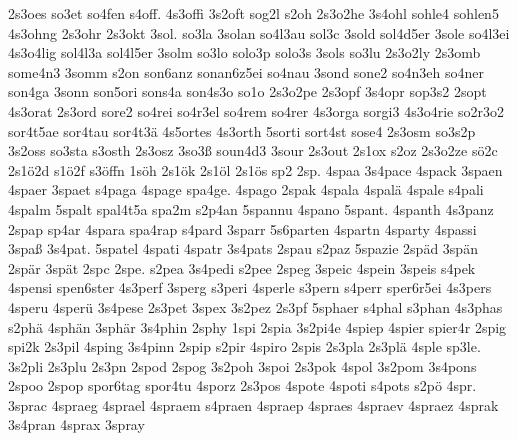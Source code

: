 {    2s3oes
    so3et
    so4fen
    s4off.
    4s3offi
    3s2oft
    sog2l
    s2oh
    2s3o2he
    3s4ohl
    sohle4
    sohlen5
    4s3ohng
    2s3ohr
    2s3okt
    3sol.
    so3la
    3solan
    so4l3au
    sol3c
    3sold
    sol4d5er
    3sole
    so4l3ei
    4s3o4lig
    sol4l3a
    sol4l5er
    3solm
    so3lo
    solo3p
    solo3s
    3sols
    so3lu
    2s3o2ly
    2s3omb
    some4n3
    3somm
    s2on
    son6anz
    sonan6z5ei
    so4nau
    3sond
    sone2
    so4n3eh
    so4ner
    son4ga
    3sonn
    son5ori
    sons4a
    son4s3o
    so1o
    2s3o2pe
    2s3opf
    3s4opr
    sop3s2
    2sopt
    4s3orat
    2s3ord
    sore2
    so4rei
    so4r3el
    so4rem
    so4rer
    4s3orga
    sorgi3
    4s3o4rie
    so2r3o2
    sor4t5ae
    sor4tau
    sor4t3ä
    4s5ortes
    4s3orth
    5sorti
    sort4st
    sose4
    2s3osm
    so3s2p
    3s2oss
    so3sta
    s3osth
    2s3osz
    3so3ß
    soun4d3
    3sour
    2s3out
    2s1ox
    s2oz
    2s3o2ze
    sö2c
    2s1ö2d
    s1ö2f
    s3öffn
    1söh
    2s1ök
    2s1öl
    2s1ös
    sp2
    2sp.
    4spaa
    3s4pace
    4spack
    3spaen
    4spaer
    3spaet
    s4paga
    4spage
    spa4ge.
    4spago
    2spak
    4spala
    4spalä
    4spale
    s4pali
    4spalm
    5spalt
    spal4t5a
    spa2m
    s2p4an
    5spannu
    4spano
    5spant.
    4spanth
    4s3panz
    2spap
    sp4ar
    4spara
    spa4rap
    s4pard
    3sparr
    5s6parten
    4spartn
    4sparty
    4spassi
    3spaß
    3s4pat.
    5spatel
    4spati
    4spatr
    3s4pats
    2spau
    s2paz
    5spazie
    2späd
    3spän
    2spär
    3spät
    2spc
    2spe.
    s2pea
    3s4pedi
    s2pee
    2speg
    3speic
    4spein
    3speis
    s4pek
    4spensi
    spen6ster
    4s3perf
    3sperg
    s3peri
    4sperle
    s3pern
    s4perr
    sper6r5ei
    4s3pers
    4speru
    4sperü
    3s4pese
    2s3pet
    3spex
    3s2pez
    2s3pf
    5sphaer
    s4phal
    s3phan
    4s3phas
    s2phä
    4sphän
    3sphär
    3s4phin
    2sphy
    1spi
    2spia
    3s2pi4e
    4spiep
    4spier
    spier4r
    2spig
    spi2k
    2s3pil
    4sping
    3s4pinn
    2spip
    s2pir
    4spiro
    2spis
    2s3pla
    2s3plä
    4sple
    sp3le.
    3s2pli
    2s3plu
    2s3pn
    2spod
    2spog
    3s2poh
    3spoi
    2s3pok
    4spol
    3s2pom
    3s4pons
    2spoo
    2spop
    spor6tag
    spor4tu
    4sporz
    2s3pos
    4spote
    4spoti
    s4pots
    s2pö
    4spr.
    3sprac
    4spraeg
    4sprael
    4spraem
    s4praen
    4spraep
    4spraes
    4spraev
    4spraez
    4sprak
    3s4pran
    4sprax
    3spray
}
